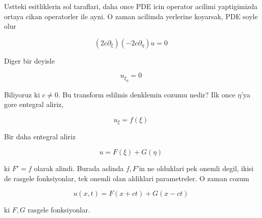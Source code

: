 \documentclass[12pt,fleqn]{article}\usepackage{../common}
\begin{document}
Ustteki esitliklerin sol taraflari, daha once PDE icin operator acilimi
yaptigimizda ortaya cikan operatorler ile ayni. O zaman acilimda yerlerine
koyarsak, PDE soyle olur

\[ (2c\partial_\xi)(-2c\partial_\eta)u = 0 \]

Diger bir deyisle 

\[ u_{\xi_\eta} = 0 \]

Biliyoruz ki $c \ne 0$. Bu transform edilmis denklemin cozumu nedir? Ilk
once $\eta$'ya gore entegral aliriz, 

\[ u_\xi = f(\xi) \]

Bir daha entegral aliriz

\[ u = F(\xi) + G(\eta) \]

ki $F' = f$ olarak alindi. Burada aslinda $f,F$'in ne olduklari pek onemli
degil, ikisi de rasgele fonksiyonlar, tek onemli olan aldiklari
parametreler. O zaman cozum 

\[ u(x,t) = F(x+ct) + G(x-ct) \]

ki $F,G$ rasgele fonksiyonlar. 
\end{document}
